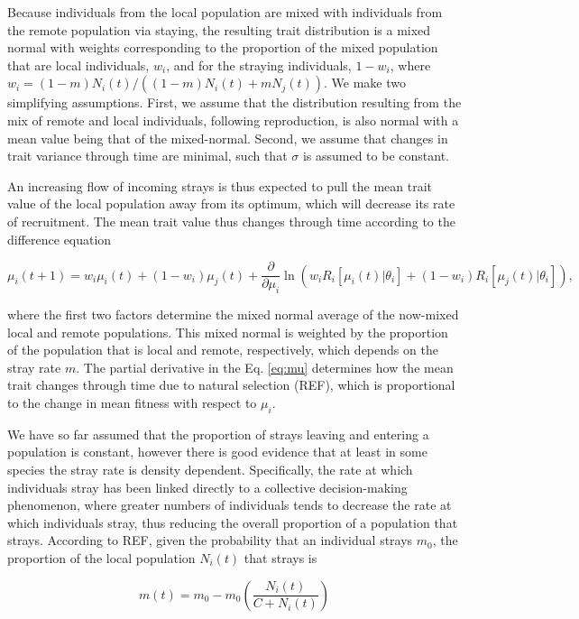 \documentclass[onecolumn,preprintnumbers,amsmath,amssymb,superscriptaddress]{revtex4}
\begin{document}
Because individuals from the local population are mixed with individuals from the remote population via staying, the resulting trait distribution is a mixed normal with weights corresponding to the proportion of the mixed population that are local individuals, $w_i$, and for the straying individuals, $1-w_i$, where $w_i=(1-m)N_i(t)/((1-m) N_i(t) + m N_j(t))$.
We make two simplifying assumptions.
First, we assume that the distribution resulting from the mix of remote and local individuals, following reproduction, is also normal with a mean value being that of the mixed-normal.
Second, we assume that changes in trait variance through time are minimal, such that $\sigma$ is assumed to be constant.

An increasing flow of incoming strays is thus expected to pull the mean trait value of the local population away from its optimum, which will decrease its rate of recruitment.
The mean trait value thus changes through time according to the difference equation

\begin{equation}
  \mu_i(t+1) = w_i\mu_i(t) + (1-w_i)\mu_j(t) + \frac{\partial}{\partial \mu_i}\ln\left(w_i R_i[\mu_i(t)|\theta_i] + (1-w_i)R_i[\mu_j(t)|\theta_i]  \right),
  \label{eq:mu}
\end{equation}

\noindent where the first two factors determine the mixed normal average of the now-mixed local and remote populations.
This mixed normal is weighted by the proportion of the population that is local and remote, respectively, which depends on the stray rate $m$.
The partial derivative in the Eq. \ref{eq:mu} determines how the mean trait changes through time due to natural selection (REF), which is proportional to the change in mean fitness with respect to $\mu_i$.


We have so far assumed that the proportion of strays leaving and entering a population is constant, however there is good evidence that at least in some species the stray rate is density dependent.
Specifically, the rate at which individuals stray has been linked directly to a collective decision-making phenomenon, where greater numbers of individuals tends to decrease the rate at which individuals stray, thus reducing the overall proportion of a population that strays.
According to REF, given the probability that an individual strays $m_0$, the proportion of the local population $N_i(t)$ that strays is

\begin{equation}
  m(t) = m_0 - m_0\left(\frac{N_i(t)}{C+N_i(t)}\right)
\end{equation}
\end{document}
